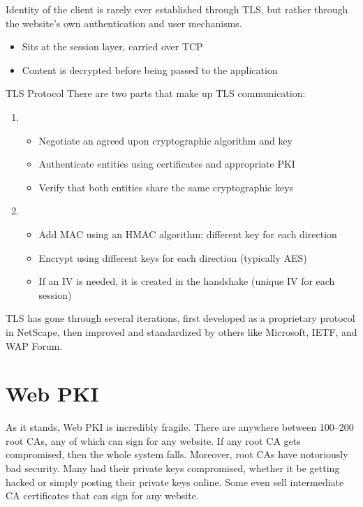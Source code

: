 Identity of the client is rarely ever established through TLS, but rather through the website's own authentication and user mechanisms.
\begin{itemize}
    \item Sits at the session layer, carried over TCP
    \item Content is decrypted before being passed to the application
\end{itemize}

\begin{tecbox}{TLS Protocol}{}
    There are two parts that make up TLS communication:
    \begin{enumerate}
        \item {}
        \begin{itemize}[noitemsep]
            \item Negotiate an agreed upon cryptographic algorithm and key
            \item Authenticate entities using certificates and appropriate PKI
            \item Verify that both entities share the same cryptographic keys
        \end{itemize}
        \item {}
        \begin{itemize}[noitemsep]
            \item Add MAC using an HMAC algorithm; different key for each direction
            \item Encrypt using different keys for each direction (typically AES)
            \item If an IV is needed, it is created in the handshake (unique IV for each session)
        \end{itemize}
    \end{enumerate}
\end{tecbox}

TLS has gone through several iterations, first developed as a proprietary protocol in NetScape, then improved and standardized by others like Microsoft, IETF, and WAP Forum.

\section{Web PKI}

As it stands, Web PKI is incredibly fragile. There are anywhere between 100--200 root CAs, any of which can sign for any website. If any root CA gets compromised, then the whole system falls. Moreover, root CAs have notoriously bad security. Many had their private keys compromised, whether it be getting hacked or simply posting their private keys online. Some even sell intermediate CA certificates that can sign for any website.


